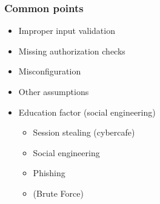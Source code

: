 \begin{frame}
\frametitle{Common points}
\begin{itemize}
\item Improper input validation
\item Missing authorization checks
\item Misconfiguration
\item Other assumptions
\item Education factor {\small (social engineering)}
	\begin{itemize}
		\item<2-5> Session stealing (cybercafe)
		\item<3-5> Social engineering
		\item<4-5> Phishing
		\item<5> (Brute Force) %
	\end{itemize}
\end{itemize}
\end{frame}
